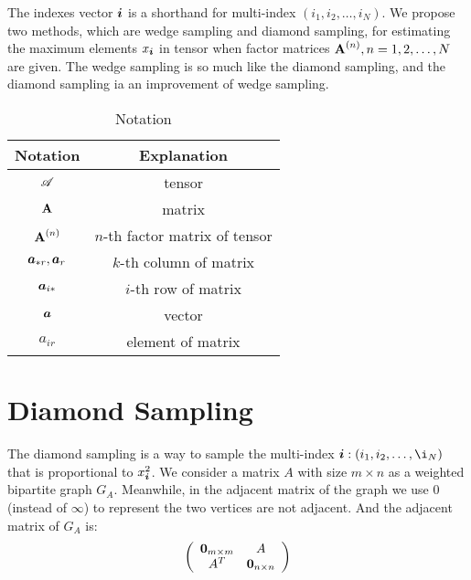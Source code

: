 \documentclass{article}
\newcommand{\T}[1]{\boldsymbol{\mathscr{\MakeUppercase{#1}}}}%
\newcommand{\V}[1]{{\bm{{\MakeLowercase{#1}}}}}%
\newcommand{\M}[1]{{\bm{\mathbf{\MakeUppercase{#1}}}}}%
\newcommand{\Mn}[2]{\M{#1}^{(#2)}}%
\begin{document}
The indexes vector $\V{i}$ is a shorthand for multi-index $(i_1,i_2,\ldots,i_N)$. We propose two methods, which are wedge sampling and diamond sampling, for
estimating the maximum elements $x_\V{i}$ in tensor when factor matrices $\Mn{A}{n}, n = 1,2,\ldots,N$ are given. The wedge sampling is so much like the diamond sampling, and the diamond sampling ia an improvement of wedge sampling.

\begin{table}
  \centering
  \begin{tabular}{|c|c|}
    \hline
    Notation & Explanation \\
    \hline
    $\T{A}$ & tensor \\
    $\M{A}$ & matrix \\
    $\Mn{A}{n}$ & $n$-th factor matrix of tensor\\
    $\V{A}_{*r},\V{A}_r$ & $k$-th column of matrix \\
    $\V{A}_{i*}$ & $i$-th row of matrix \\
    $\V{A}$ & vector \\
    $a_{ir}$ & element of matrix\\
    \hline
  \end{tabular}
  \caption{Notation}\label{table:Notation}
\end{table}

\section{Diamond Sampling}
The diamond sampling is a way to sample the multi-index $\V{i}:(i_1,i_2,\ldots,\i_N)$  that is proportional to $x_{\V{i}}^2$.
We consider a matrix $A$ with size $m\times n$ as a weighted bipartite graph $G_{A}$. Meanwhile, in the adjacent matrix of the graph we use $0$(instead of $\infty$) to represent the two vertices are not adjacent. And the adjacent matrix of $G_{A}$ is:
\[
\left(
  \begin{array}{cc}
    \V{0}_{m\times m} & A \\
    A^T & \V{0}_{n\times n} \\
  \end{array}
\right)
\]
\end{document}
